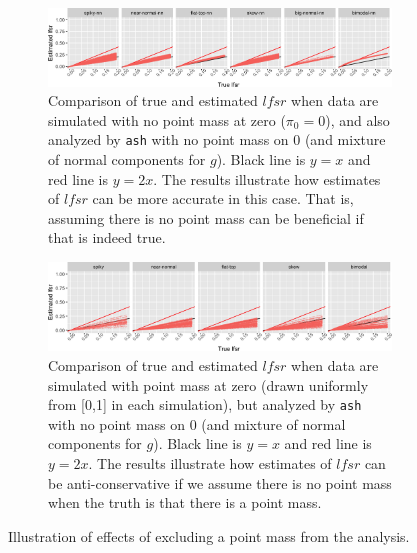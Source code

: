 \documentclass[11pt]{article}
\def\lfsr{\textit{lfsr}}
\def\ash{{\tt ash}\xspace}
\begin{document}
\begin{figure}
\begin{center}
\begin{subfigure}{\textwidth}
\includegraphics[width=\textwidth]{../analysis/figure/plot_lfsr.Rmd/plot_lfsr_s_nn-1.png} 
\caption{Comparison of true and estimated $\lfsr$ when data are simulated with no point mass at zero ($\pi_0=0$), and also analyzed by \ash with no point mass on 0 (and mixture of normal components for $g$). Black line is $y=x$ and red line is $y=2x$. The results illustrate how estimates of $\lfsr$ can be more accurate in this case. That is, assuming there is no point mass can be beneficial if that is indeed true.}  \label{fig:lfsr-nn}
\end{subfigure}
\begin{subfigure}{\textwidth}
\includegraphics[width=\textwidth]{../analysis/figure/plot_lfsr.Rmd/plot_lfsr_s-1.png} 
\caption{Comparison of true and estimated $\lfsr$ when data are simulated with point mass at zero (drawn uniformly from [0,1] in each simulation), but analyzed by \ash with no point mass on 0 (and mixture of normal components for $g$). Black line is $y=x$ and red line is $y=2x$. The results illustrate how estimates of $\lfsr$ can be anti-conservative if we assume there is no point mass when the truth is that there is a point mass.} \label{fig:lfsr-s}
\end{subfigure}
\end{center}
\caption{Illustration of effects of excluding a point mass from the analysis.} \label{fig:lfsr-nopointmass}
\end{figure}
\end{document}

